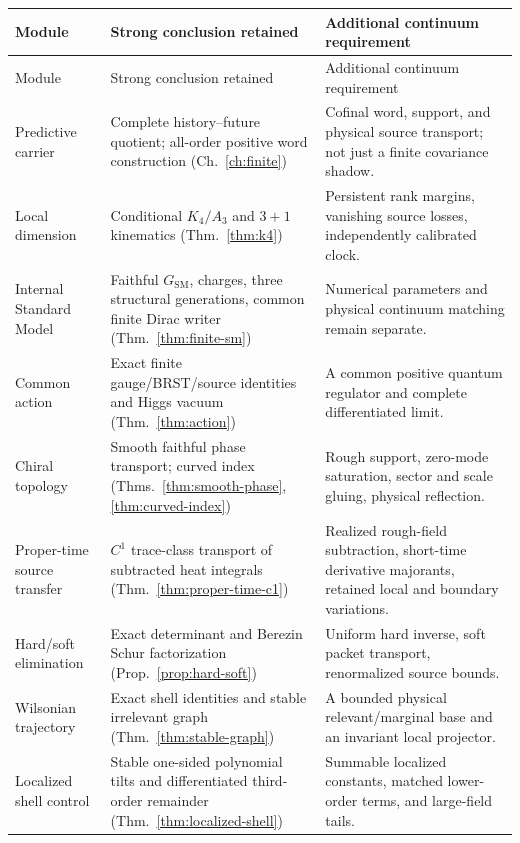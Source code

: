 \documentclass[11pt,a4paper,oneside]{book}
\theoremstyle{plain}
\theoremstyle{definition}
\theoremstyle{remark}
\newcommand{\GSM}{G_{\mathrm{SM}}}
\begin{document}
\footnotesize
\begin{longtable}{@{}>{\raggedright\arraybackslash}p{}>{\raggedright\arraybackslash}p{}>{\raggedright\arraybackslash}p{}@{}}
\toprule
Module & Strong conclusion retained & Additional continuum requirement\\
\midrule
\endfirsthead
\toprule
Module & Strong conclusion retained & Additional continuum requirement\\
\midrule
\endhead
\bottomrule
\endfoot
Predictive carrier & Complete history--future quotient; all-order positive word construction (Ch.~\ref{ch:finite}) & Cofinal word, support, and physical source transport; not just a finite covariance shadow.\\[1pt]
Local dimension & Conditional $K_4/A_3$ and $3+1$ kinematics (Thm.~\ref{thm:k4}) & Persistent rank margins, vanishing source losses, independently calibrated clock.\\[1pt]
Internal Standard Model & Faithful $\GSM$, charges, three structural generations, common finite Dirac writer (Thm.~\ref{thm:finite-sm}) & Numerical parameters and physical continuum matching remain separate.\\[1pt]
Common action & Exact finite gauge/BRST/source identities and Higgs vacuum (Thm.~\ref{thm:action}) & A common positive quantum regulator and complete differentiated limit.\\[1pt]
Chiral topology & Smooth faithful phase transport; curved index (Thms.~\ref{thm:smooth-phase}, \ref{thm:curved-index}) & Rough support, zero-mode saturation, sector and scale gluing, physical reflection.\\[1pt]
Proper-time source transfer & $C^1$ trace-class transport of subtracted heat integrals (Thm.~\ref{thm:proper-time-c1}) & Realized rough-field subtraction, short-time derivative majorants, retained local and boundary variations.\\[1pt]
Hard/soft elimination & Exact determinant and Berezin Schur factorization (Prop.~\ref{prop:hard-soft}) & Uniform hard inverse, soft packet transport, renormalized source bounds.\\[1pt]
Wilsonian trajectory & Exact shell identities and stable irrelevant graph (Thm.~\ref{thm:stable-graph}) & A bounded physical relevant/marginal base and an invariant local projector.\\[1pt]
Localized shell control & Stable one-sided polynomial tilts and differentiated third-order remainder (Thm.~\ref{thm:localized-shell}) & Summable localized constants, matched lower-order terms, and large-field tails.\\[1pt]

\end{longtable}
\end{document}
